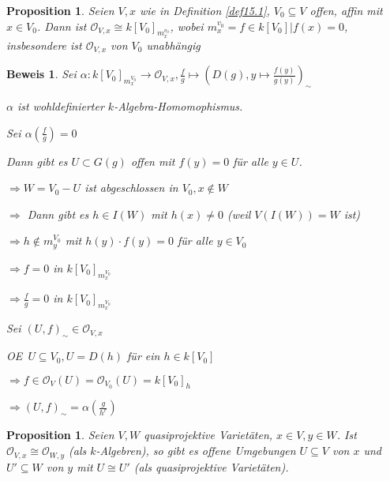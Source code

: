 \documentclass[a4paper, 12pt, numbers=noendperiod, chapterprefix=true, headsepline]{scrbook}
\theoremstyle{break}
\newtheorem{Prop}[Def]{Proposition}
\theoremstyle{nonumberbreak}
\newtheorem{Bew}{Beweis}
\theoremstyle{nonumberplain}
\newcommand{\calO}{\mathcal{O}}
\renewcommand{\OE}{O\!\!E~}
\begin{document}
\begin{Prop}\label{prop15.4}
Seien $V,x$ wie in Definition \ref{def15.1}, $V_0\subseteq V$ offen, affin mit $x\in V_0$. Dann ist $\calO_{V,x}\cong k[V_0]_{m_x^{v_0}}$, wobei $m_x^{v_0}={f \in k[V_0] | f(x)=0}$, insbesondere ist $\calO_{V,x}$ von $V_0$ unabh\"angig
\end{Prop}

\begin{Bew}
Sei $\alpha:k[V_0]_{m_x^{V_0}}\to \calO_{V,x}, \frac{f}{g}\mapsto(D(g),y\mapsto\frac{f(y)}{g(y)})_\sim$

$\alpha$ ist wohldefinierter $k$-Algebra-Homomophismus.
\begin{description}[\setlabelstyle{\itshape}]
\item[$\alpha$ ist injektiv:]
	Sei $\alpha(\frac{f}{g})=0$
	
	Dann gibt es $U\subset G(g)$ offen mit $f(y)=0$ f\"ur alle $y\in U$.
	
	$\Rightarrow W=V_0-U$ ist abgeschlossen in $V_0, x\notin W$
	
	$\Rightarrow $ Dann gibt es $h\in I(W)$ mit $h(x)\ne0$ (weil $V(I(W))=W$ ist)
	
	$\Rightarrow h\notin m_y^{V_0}$ mit $h(y)\cdot f(y)=0$ f\"ur alle $y\in V_0$
	
	$\Rightarrow f=0$ in $k[V_0]_{m_x^{V_0}}$
	
	$\Rightarrow \frac{f}{g}=0$ in $k[V_0]_{m_x^{V_0}}$
\item[$\alpha$ ist surjektiv:]
	Sei $(U,f)_\sim\in\calO_{V,x}$
	
	\OE $U\subseteq V_0, U=D(h)$ f\"ur ein $h\in k[V_0]$
	
	$\Rightarrow f\in\calO_V(U)=\calO_{V_0}(U)=k[V_0]_h$
	
	$\Rightarrow (U,f)_\sim=\alpha(\frac{g}{h^r})$
\end{description}\end{Bew}

\begin{Prop}\label{prop15.5}
Seien $V,W$ quasiprojektive Variet\"aten, $x\in V, y\in W$. Ist $\calO_{V,x}\cong\calO_{W,y}$ (als $k$-Algebren), so gibt es offene Umgebungen $U\subseteq V$ von $x$ und $U'\subseteq W$ von $y$ mit $U\cong U'$ (als quasiprojektive Variet\"aten).
\end{Prop}
\end{document}
